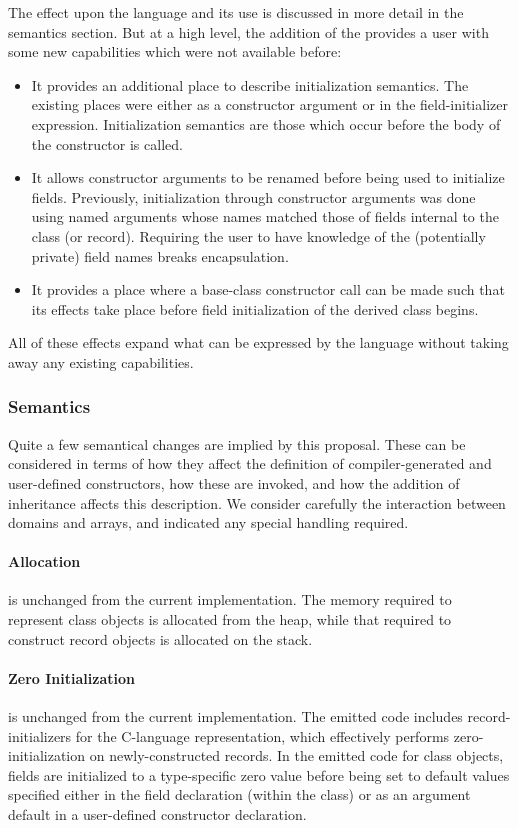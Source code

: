 The effect upon the language and its use is discussed in more detail in the
semantics section.  But at a high level, the addition of
the  provides a user with some new capabilities
which were not available before:
\begin{itemize}
\item It provides an additional place to describe initialization semantics.  The
existing places were either as a constructor argument or in the
field-initializer expression.  Initialization semantics are those which occur
before the body of the constructor is called.
\item It allows constructor arguments to be renamed before being used to
initialize fields.  Previously, initialization
through constructor arguments was done using named arguments whose names matched
those of fields internal to the class (or record).  Requiring the user to have
knowledge of the (potentially private) field names breaks encapsulation.
\item It provides a place where a base-class constructor call can be made such
that its effects take place before field initialization of the derived class begins.
\end{itemize}
All of these effects expand what can be expressed by the language without taking
away any existing capabilities.

\subsubsection{Semantics}

Quite a few semantical changes are implied by this proposal.  These can be
considered in terms of how they affect the definition of compiler-generated and
user-defined constructors, how these are invoked, and how the addition of
inheritance affects this description.  We consider carefully the interaction
between domains and arrays, and indicated any special handling required.

\paragraph{Allocation} is unchanged from the current implementation.  The memory
required to represent class objects is allocated from the heap, while that
required to construct record objects is allocated on the stack.  

\paragraph{Zero Initialization} is unchanged from the current implementation.
The emitted code includes record-initializers for
the C-language representation, which effectively performs zero-initialization on
newly-constructed records.  In the emitted code for class objects, fields are
initialized to a type-specific zero value before being set to default values
specified either in the field declaration (within the class) or as an argument
default in a user-defined constructor declaration.  

